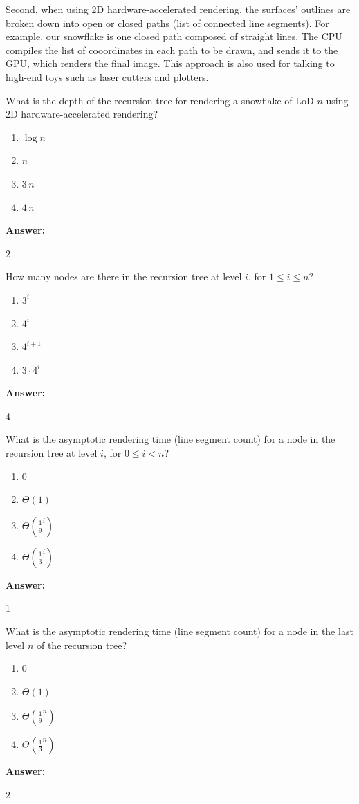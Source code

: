 \documentclass[12pt,twoside]{article}
\newcommand{\answer}{
	\par\medskip
	\textbf{Answer:}
}
\newcommand{\answerIf}{ \answer
	2
}
\newcommand{\answerIg}{ \answer
	4
}
\newcommand{\answerIh}{ \answer
	1
}
\newcommand{\answerIi}{ \answer
	2
}
\begin{document}
\begin{problems}
	Second, when using 2D hardware-accelerated rendering, the surfaces'
	outlines are broken down into open or closed paths (list of connected
	line segments). For example, our snowflake is one closed path composed of
	straight lines. The CPU compiles the list of cooordinates in each path to be
	drawn, and sends it to the GPU, which renders the final image. This approach is
	also used for talking to high-end toys such as laser cutters and plotters.

	\begin{problemparts}
		\problempart {} What is the depth of the recursion tree for rendering a
		snowflake of LoD $n$ using 2D hardware-accelerated rendering?
		\begin{enumerate}
			\item $\log n$
			\item $n$
			\item $3 \, n$
			\item $4 \, n$
		\end{enumerate}
		\answerIf

		\problempart {} How many nodes are there in the recursion tree at level
		$i$, for $1 \le i \le n$?
		\begin{enumerate}
			\item $3 ^ i$
			\item $4 ^ i$
			\item $4 ^ {i + 1}$
			\item $3 \cdot 4 ^ i$
		\end{enumerate}
		\answerIg

		\problempart {} What is the asymptotic rendering time (line segment count)
		for a node in the recursion tree at level $i$, for $0 \le i < n$?
		\begin{enumerate}
			\item $0$
			\item $\Theta(1)$
			\item $\Theta(\frac{1}{9}^i)$
			\item $\Theta(\frac{1}{3}^i)$
		\end{enumerate}
		\answerIh

		\problempart {} What is the asymptotic rendering time (line segment count)
		for a node in the last level $n$ of the recursion tree?
		\begin{enumerate}
			\item $0$
			\item $\Theta(1)$
			\item $\Theta(\frac{1}{9}^n)$
			\item $\Theta(\frac{1}{3}^n)$
		\end{enumerate}
		\answerIi


\end{problemparts}
\end{problems}
\end{document}
